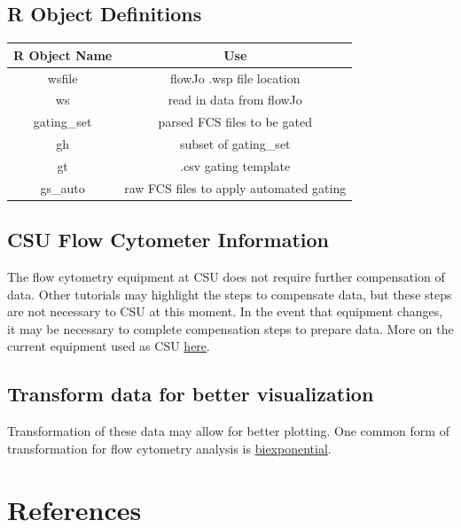 \documentclass[]{book}
\begin{document}
\hypertarget{r-object-definitions}{%
\section{R Object Definitions}\label{r-object-definitions}}

\begin{tabular}{c|c}
\hline
R Object Name & Use\\
\hline
wsfile & flowJo .wsp file location\\
\hline
ws & read in data from flowJo\\
\hline
gating\_set & parsed FCS files to be gated\\
\hline
gh & subset of gating\_set\\
\hline
gt & .csv gating template\\
\hline
gs\_auto & raw FCS files to apply automated gating\\
\hline
\end{tabular}

\hypertarget{csu-flow-cytometer-information}{%
\section{CSU Flow Cytometer Information}\label{csu-flow-cytometer-information}}

The flow cytometry equipment at CSU does not require further compensation of data. Other tutorials may highlight the steps to compensate data, but these steps are not necessary to CSU at this moment. In the event that equipment changes, it may be necessary to complete compensation steps to prepare data. More on the current equipment used as CSU \href{https://www.umassmed.edu/facslab/instrument/core-cytek-aurora2/}{here}.

\hypertarget{transform-data-for-better-visualization}{%
\section{Transform data for better visualization}\label{transform-data-for-better-visualization}}

Transformation of these data may allow for better plotting. One common form of transformation for flow cytometry analysis is \href{http://docs.flowjo.com/vx/graphs-and-gating/gw-transform-overview/}{biexponential}.

\hypertarget{references}{%
\chapter{References}\label{references}}
\end{document}
